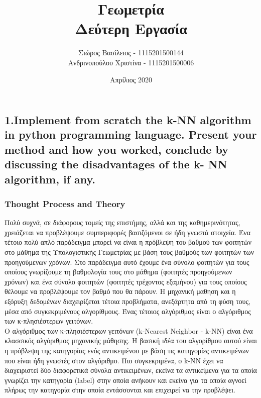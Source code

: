 \documentclass[12pt]{article}
\title{\hugeΥπολογιστική Γεωμετρία\\Δεύτερη Εργασία}
\author{Σιώρος Βασίλειος - 1115201500144\\Ανδρινοπούλου Χριστίνα - 1115201500006}
\date{Απρίλιος 2020}
\begin{document}
\maketitle


\pagebreak


\subsection*{1.Implement from scratch the k-NN algorithm in python programming language.
	Present your method and how you worked, conclude by discussing the disadvantages of the k-
	NN algorithm, if any.}

\subsubsection*{Thought Process and Theory}

Πολύ συχνά, σε διάφορους τομείς της επιστήμης, αλλά και της καθημερινότητας, χρειάζεται να προβλέψουμε συμπεριφορές βασιζόμενοι σε ήδη γνωστά στοιχεία. Ένα τέτοιο πολύ απλό παράδειγμα μπορεί να είναι η πρόβλεψη του βαθμού των φοιτητών στο μάθημα της Υπολογιστικής Γεωμετρίας με βάση τους βαθμούς των φοιτητών των προηγούμενων χρόνων. Στο παράδειγμα αυτό έχουμε ένα σύνολο φοιτητών για τους οποίους γνωρίζουμε τη βαθμολογία τους στο μάθημα (φοιτητές προηγούμενων χρόνων) και ένα σύνολο φοιτητών (φοιτητές τρέχοντος εξαμήνου) για τους οποίους θέλουμε να προβλέψουμε τον βαθμό που θα πάρουν. Η μηχανική μαθηση και η εξόρυξη δεδομένων διαχειρίζεται τέτοια προβλήματα, ανεξάρτητα από τη φύση τους, μέσα από συγκεκριμένους αλγορίθμους. Ένας τέτοιος αλγόριθμος είναι ο αλγόριθμος των κ-πλησιέστερων γειτόνων. \\
 
Ο αλγόριθμος των κ-πλησιέστερων γειτόνων (k-Nearest Neighbor - k-NN) είναι ένα κλασσικός αλγόριθμος μηχανικής μάθησης. Η βασική ιδέα του αλγορίθμου αυτού είναι η πρόβλεψη της κατηγορίας ενός αντικειμένου με βάση τις κατηγορίες αντικειμένων που είναι ήδη γνωστές στον αλγόριθμο. Πιο συγκεκριμένα, ο k-NN έχει να διαχειριστεί δύο διαφορετικά σύνολα αντικειμένων, εκείνα τα αντικείμενα για τα οποία γνωρίζει την κατηγορία (label) στην οποία ανήκουν και εκείνα για τα οποία αγνοεί πλήρως την κατηγορία στην οποία εντάσσονται και επιχειρεί να την προβλέψει. \\
\end{document}
